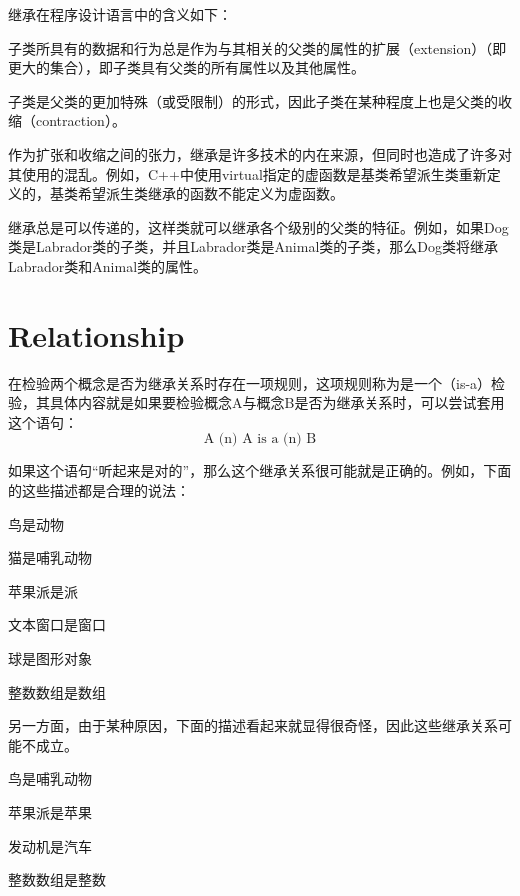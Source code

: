 继承在程序设计语言中的含义如下：

\begin{compactitem}
\item 子类所具有的数据和行为总是作为与其相关的父类的属性的扩展（extension）（即更大的集合），即子类具有父类的所有属性以及其他属性。
\item 子类是父类的更加特殊（或受限制）的形式，因此子类在某种程度上也是父类的收缩（contraction）。
\end{compactitem}

作为扩张和收缩之间的张力，继承是许多技术的内在来源，但同时也造成了许多对其使用的混乱。例如，C++中使用virtual指定的虚函数是基类希望派生类重新定义的，基类希望派生类继承的函数不能定义为虚函数。


继承总是可以传递的，这样类就可以继承各个级别的父类的特征。例如，如果Dog类是Labrador类的子类，并且Labrador类是Animal类的子类，那么Dog类将继承Labrador类和Animal类的属性。


\section{Relationship}




在检验两个概念是否为继承关系时存在一项规则，这项规则称为是一个（is-a）检验，其具体内容就是如果要检验概念A与概念B是否为继承关系时，可以尝试套用这个语句：
\[\mbox{A (n) A is a (n) B}\]

如果这个语句“听起来是对的”，那么这个继承关系很可能就是正确的。例如，下面的这些描述都是合理的说法：

\begin{compactenum}
\item 鸟是动物
\item 猫是哺乳动物
\item 苹果派是派
\item 文本窗口是窗口
\item 球是图形对象
\item 整数数组是数组
\end{compactenum}

另一方面，由于某种原因，下面的描述看起来就显得很奇怪，因此这些继承关系可能不成立。

\begin{compactenum}
\item 鸟是哺乳动物
\item 苹果派是苹果
\item 发动机是汽车
\item 整数数组是整数
\end{compactenum}


